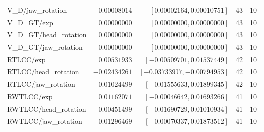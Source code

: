 \begin{table}[t]
\begin{tabular}{lrrrr}
V\_D/jaw\_rotation & $0.00008014$ & $[0.00002164, 0.00010751]$ & 43 & 10 \\
V\_D\_GT/exp & $0.00000000$ & $[0.00000000, 0.00000000]$ & 43 & 10 \\
V\_D\_GT/head\_rotation & $0.00000000$ & $[0.00000000, 0.00000000]$ & 43 & 10 \\
V\_D\_GT/jaw\_rotation & $0.00000000$ & $[0.00000000, 0.00000000]$ & 43 & 10 \\
RTLCC/exp & $0.00531933$ & $[-0.00509701, 0.01537449]$ & 42 & 10 \\
RTLCC/head\_rotation & $-0.02434261$ & $[-0.03733907, -0.00794953]$ & 42 & 10 \\
RTLCC/jaw\_rotation & $0.01024499$ & $[-0.01555633, 0.01899345]$ & 42 & 10 \\
RWTLCC/exp & $0.01162071$ & $[-0.00046642, 0.01693266]$ & 41 & 10 \\
RWTLCC/head\_rotation & $-0.00451499$ & $[-0.01690729, 0.01010934]$ & 41 & 10 \\
RWTLCC/jaw\_rotation & $0.01296469$ & $[-0.00070337, 0.01873512]$ & 41 & 10 \\
\bottomrule
\end{tabular}
\end{table}
